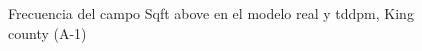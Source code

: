 \begin{figure}[H]
    \centering
    
    \caption{Frecuencia del campo Sqft above en el modelo real y tddpm, King county (A-1)}
    \label{frecuency-tddpm-sqft above}
\end{figure}